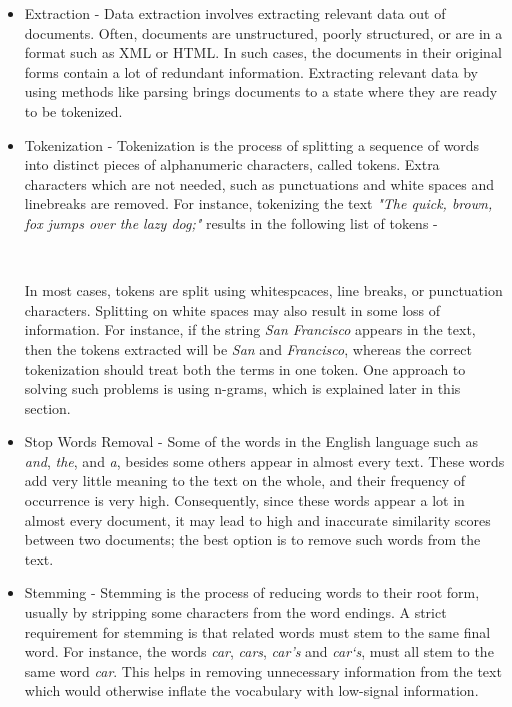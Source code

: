 \begin{itemize}
    \item{
    Extraction - Data extraction involves extracting relevant data out of documents. Often, documents are unstructured, poorly structured, or are in a format such as XML or HTML. In such cases, the documents in their original forms contain a lot of redundant information. Extracting relevant data by using methods like parsing brings documents to a state where they are ready to be tokenized.
    }
    \item{
    Tokenization - Tokenization is the process of splitting a sequence of words into distinct pieces of alphanumeric characters, called tokens. Extra characters which are not needed, such as punctuations and white spaces and linebreaks are removed. For instance, tokenizing the text \emph{"The quick, brown, fox jumps over the lazy dog;"} results in the following list of tokens - \\
    \begin{center}
                \\
    \end{center}
    In most cases, tokens are split using whitespcaces, line breaks, or punctuation characters. Splitting on white spaces may also result in some loss of information. For instance, if the string \emph{San Francisco} appears in the text, then the tokens extracted will be \emph{San} and \emph{Francisco}, whereas the correct tokenization should treat both the terms in one token. One approach to solving such problems is using n-grams, which is explained later in this section.
    }
    \item{
    Stop Words Removal - Some of the words in the English language such as \emph{and}, \emph{the}, and \emph{a}, besides some others appear in almost every text. These words add very little meaning to the text on the whole, and their frequency of occurrence is very high. Consequently, since these words appear a lot in almost every document, it may lead to high and inaccurate similarity scores between two documents; the best option is to remove such words from the text.
    }
    \item{
    Stemming - Stemming is the process of reducing words to their root form, usually by stripping some characters from the word endings. A strict requirement for stemming is that related words must stem to the same final word. For instance, the words \emph{car}, \emph{cars}, \emph{car's} and \emph{car`s}, must all stem to the same word \emph{car}. This helps in removing unnecessary information from the text which would otherwise inflate the vocabulary with low-signal information.
    }
\end{itemize}

